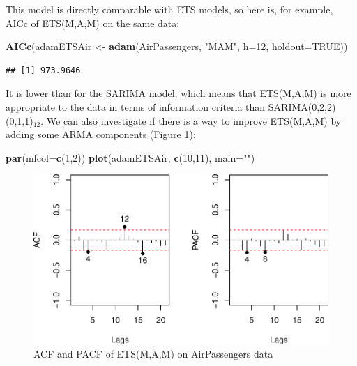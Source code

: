 \documentclass[]{book}
\newenvironment{Shaded}{\begin{snugshade}}{\end{snugshade}}
\newcommand{\DataTypeTok}[1]{\textcolor[rgb]{0.13,0.29,0.53}{#1}}
\newcommand{\DecValTok}[1]{\textcolor[rgb]{0.00,0.00,0.81}{#1}}
\newcommand{\KeywordTok}[1]{\textcolor[rgb]{0.13,0.29,0.53}{\textbf{#1}}}
\newcommand{\NormalTok}[1]{#1}
\newcommand{\OtherTok}[1]{\textcolor[rgb]{0.56,0.35,0.01}{#1}}
\newcommand{\StringTok}[1]{\textcolor[rgb]{0.31,0.60,0.02}{#1}}
\theoremstyle{definition}
\theoremstyle{definition}
\theoremstyle{definition}
\theoremstyle{definition}
\theoremstyle{remark}
\begin{document}
This model is directly comparable with ETS models, so here is, for example, AICc of ETS(M,A,M) on the same data:

\begin{Shaded}
\begin{Highlighting}[]
\KeywordTok{AICc}\NormalTok{(adamETSAir <-}\StringTok{ }\KeywordTok{adam}\NormalTok{(AirPassengers, }\StringTok{"MAM"}\NormalTok{,}
                        \DataTypeTok{h=}\DecValTok{12}\NormalTok{, }\DataTypeTok{holdout=}\OtherTok{TRUE}\NormalTok{))}
\end{Highlighting}
\end{Shaded}

\begin{verbatim}
## [1] 973.9646
\end{verbatim}

It is lower than for the SARIMA model, which means that ETS(M,A,M) is more appropriate to the data in terms of information criteria than SARIMA(0,2,2)(0,1,1)\(_{12}\). We can also investigate if there is a way to improve ETS(M,A,M) by adding some ARMA components (Figure \ref{fig:adamETSPlotAirACFPACF}):

\begin{Shaded}
\begin{Highlighting}[]
\KeywordTok{par}\NormalTok{(}\DataTypeTok{mfcol=}\KeywordTok{c}\NormalTok{(}\DecValTok{1}\NormalTok{,}\DecValTok{2}\NormalTok{))}
\KeywordTok{plot}\NormalTok{(adamETSAir, }\KeywordTok{c}\NormalTok{(}\DecValTok{10}\NormalTok{,}\DecValTok{11}\NormalTok{), }\DataTypeTok{main=}\StringTok{""}\NormalTok{)}
\end{Highlighting}
\end{Shaded}

\begin{figure}
\centering
\includegraphics{Svetunkov--2022----ADAM_files/figure-latex/adamETSPlotAirACFPACF-1.pdf}
\caption{\label{fig:adamETSPlotAirACFPACF}ACF and PACF of ETS(M,A,M) on AirPassengers data}
\end{figure}
\end{document}

